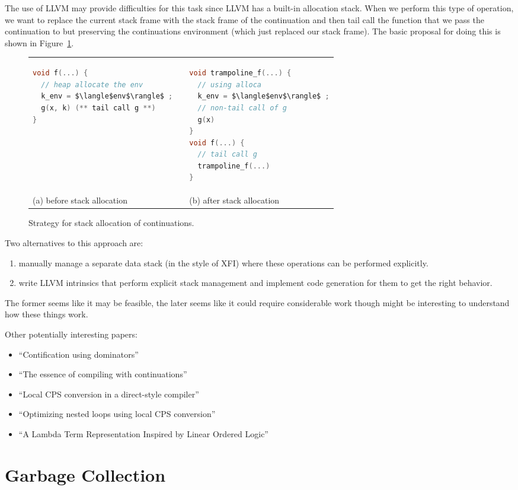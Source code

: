 \documentclass{article}
\begin{document}
The use of LLVM may provide difficulties for this task since LLVM has a built-in allocation stack. When we perform this type of operation, we want to replace the current stack frame with the stack frame of the continuation and then tail call the function that we pass the continuation to but preserving the continuations environment (which just replaced our stack frame). The basic proposal for doing this is shown in Figure~\ref{fig:stack-alloc}. 

\begin{figure}
\begin{tabular}{p{} c p{}}
\begin{lstlisting}[language=c]
void f(...) { 
  // heap allocate the env
  k_env = $\langle$env$\rangle$ ;
  g(x, k) (** tail call g **)
}
\end{lstlisting}
& \quad
& 
\begin{lstlisting}[language=c]
void trampoline_f(...) {
  // using alloca
  k_env = $\langle$env$\rangle$ ;
  // non-tail call of g
  g(x)
}
void f(...) {
  // tail call g
  trampoline_f(...)
}
\end{lstlisting}
\\
(a) before stack allocation & &
(b) after stack allocation \\ 
\end{tabular}
\caption{Strategy for stack allocation of continuations.}
\label{fig:stack-alloc}
\end{figure}

Two alternatives to this approach are:
\begin{enumerate}
\item manually manage a separate data stack (in the style of XFI) where these operations can be performed explicitly.
\item write LLVM intrinsics that perform explicit stack management and implement code generation for them to get the right behavior.
\end{enumerate}
The former seems like it may be feasible, the later seems like it could require considerable work though might be interesting to understand how these things work.

Other potentially interesting papers:
\begin{itemize}
\item ``Contification using dominators''~\cite{fluet01contification}
\item ``The essence of compiling with continuations''~\cite{flanagan04essence}
\item ``Local CPS conversion in a direct-style compiler''~\cite{reppy01local}
\item ``Optimizing nested loops using local CPS conversion''~\cite{reppy02optimizing}
\item ``A Lambda Term Representation Inspired by Linear Ordered Logic''~\cite{abel11lambda}
\end{itemize}

\section{Garbage Collection}
\label{sec:gc}



\end{document}
